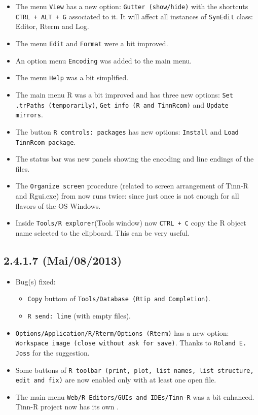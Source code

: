 \begin{itemize}
  \item The menu \texttt{View} has a new option: \texttt{Gutter (show/hide)} with the shortcuts
   \texttt{CTRL + ALT + G} associated to it. It will affect all instances of \texttt{SynEdit} class:
   Editor, Rterm and Log.
  \item The menu \texttt{Edit} and \texttt{Format} were a bit improved.
  \item An option menu \texttt{Encoding} was added to the main menu.
  \item The menu \texttt{Help} was a bit simplified.
  \item The main menu R was a bit improved and has three new options:
   \texttt{Set .trPaths (temporarily)}, \texttt{Get info (R and TinnRcom)} and \texttt{Update mirrors}.
  \item The button \texttt{R controls: packages} has new options: \texttt{Install} and
  \texttt{Load TinnRcom package}.
  \item The status bar was new panels showing the encoding and line endings of the files.
  \item The \texttt{Organize screen} procedure (related to screen arrangement of Tinn-R and Rgui.exe)
   from now runs twice: since just once is not enough for all flavors of the OS Windows.
  \item Inside \texttt{Tools/R explorer}(Tools window) now \texttt{CTRL + C} copy
   the R object name selected to the clipboard.
   This can be very useful.
\end{itemize}


\subsection*{2.4.1.7 (Mai/08/2013)}
\begin{itemize}
  \item Bug(s) fixed:
    \begin{itemize}
      \item \texttt{Copy} buttom of \texttt{Tools/Database (Rtip and Completion)}.
      \item \texttt{R send: line} (with empty files).
    \end{itemize}
  \item \texttt{Options/Application/R/Rterm/Options (Rterm)} has a new option:
   \texttt{Workspace image (close without ask for save)}.
   Thanks to \texttt{Roland E. Joss} for the suggestion.
  \item Some buttons of \texttt{R toolbar (print, plot, list names, list structure, edit and fix)}
   are now enabled only with at least one open file.
  \item The main menu \texttt{Web/R Editors/GUIs and IDEs/Tinn-R} was a bit enhanced.
   Tinn-R project now has its own .
\end{itemize}


